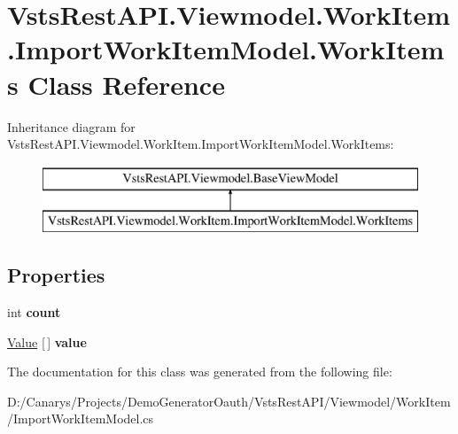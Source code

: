 \hypertarget{class_vsts_rest_a_p_i_1_1_viewmodel_1_1_work_item_1_1_import_work_item_model_1_1_work_items}{}\section{Vsts\+Rest\+A\+P\+I.\+Viewmodel.\+Work\+Item.\+Import\+Work\+Item\+Model.\+Work\+Items Class Reference}
\label{class_vsts_rest_a_p_i_1_1_viewmodel_1_1_work_item_1_1_import_work_item_model_1_1_work_items}
Inheritance diagram for Vsts\+Rest\+A\+P\+I.\+Viewmodel.\+Work\+Item.\+Import\+Work\+Item\+Model.\+Work\+Items\+:\begin{figure}[H]
\begin{center}
\leavevmode
\includegraphics[height=2.000000cm]{class_vsts_rest_a_p_i_1_1_viewmodel_1_1_work_item_1_1_import_work_item_model_1_1_work_items}
\end{center}
\end{figure}
\subsection*{Properties}
\begin{DoxyCompactItemize}
\item 
\mbox{\label{class_vsts_rest_a_p_i_1_1_viewmodel_1_1_work_item_1_1_import_work_item_model_1_1_work_items_a423cd7d0de2b9d41c5a340eb1a38bd90}} 
int {\bfseries count}
\item 
\mbox{\label{class_vsts_rest_a_p_i_1_1_viewmodel_1_1_work_item_1_1_import_work_item_model_1_1_work_items_aac7408f377464af62f3901ac083ed801}} 
\mbox{\hyperlink{class_vsts_rest_a_p_i_1_1_viewmodel_1_1_work_item_1_1_import_work_item_model_1_1_value}{Value}} \mbox{[}$\,$\mbox{]} {\bfseries value}
\end{DoxyCompactItemize}


The documentation for this class was generated from the following file\+:\begin{DoxyCompactItemize}
\item 
D\+:/\+Canarys/\+Projects/\+Demo\+Generator\+Oauth/\+Vsts\+Rest\+A\+P\+I/\+Viewmodel/\+Work\+Item/Import\+Work\+Item\+Model.\+cs\end{DoxyCompactItemize}
